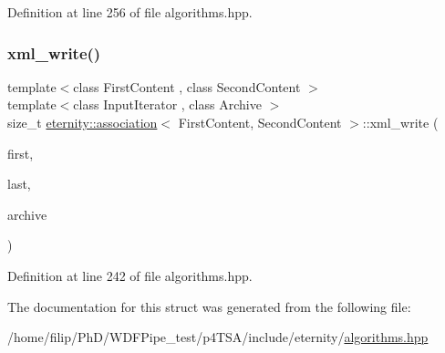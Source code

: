 Definition at line 256 of file algorithms.\+hpp.

\mbox{\label{structeternity_1_1association_a826dce070ffd89015b66ea9ea26c07e2}} 
\subsubsection{\texorpdfstring{xml\+\_\+write()}{xml\_write()}}
{\footnotesize\ttfamily template$<$class First\+Content , class Second\+Content $>$ \\
template$<$class Input\+Iterator , class Archive $>$ \\
size\+\_\+t \hyperlink{structeternity_1_1association}{eternity\+::association}$<$ First\+Content, Second\+Content $>$\+::xml\+\_\+write (\begin{DoxyParamCaption}\item[{Input\+Iterator}]{first,  }\item[{Input\+Iterator}]{last,  }\item[{Archive \&}]{archive }\end{DoxyParamCaption})}



Definition at line 242 of file algorithms.\+hpp.



The documentation for this struct was generated from the following file\+:\begin{DoxyCompactItemize}
\item 
/home/filip/\+Ph\+D/\+W\+D\+F\+Pipe\+\_\+test/p4\+T\+S\+A/include/eternity/\hyperlink{algorithms_8hpp}{algorithms.\+hpp}\end{DoxyCompactItemize}
